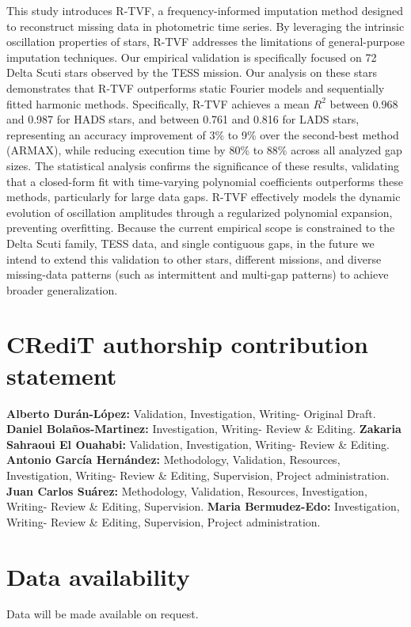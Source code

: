 \documentclass[a4paper,fleqn]{cas-sc}
\begin{document}
This study introduces R-TVF, a frequency-informed imputation method designed to reconstruct missing data in photometric time series. By leveraging the intrinsic oscillation properties of stars, R-TVF addresses the limitations of general-purpose imputation techniques. Our empirical validation is specifically focused on 72 Delta Scuti stars observed by the TESS mission. Our analysis on these stars demonstrates that R-TVF outperforms static Fourier models and sequentially fitted harmonic methods.  Specifically, R-TVF achieves a mean $R^2$ between 0.968 and 0.987 for HADS stars, and between 0.761 and 0.816 for LADS stars, representing an accuracy improvement of 3\% to 9\% over the second-best method (ARMAX), while reducing execution time by 80\% to 88\% across all analyzed gap sizes. The statistical analysis confirms the significance of these results, validating that a closed-form fit with time-varying polynomial coefficients outperforms these methods, particularly for large data gaps. R-TVF effectively models the dynamic evolution of oscillation amplitudes through a regularized polynomial expansion, preventing overfitting. Because the current empirical scope is constrained to the Delta Scuti family, TESS data, {\color{blue}and single contiguous gaps}, in the future we intend to extend this validation to other stars, different missions, {\color{blue}and diverse missing-data patterns (such as intermittent and multi-gap patterns)} to achieve broader generalization.


\section*{CRediT authorship contribution statement}
\textbf{Alberto Durán-López:} Validation, Investigation, Writing- Original Draft. \textbf{Daniel Bolaños-Martinez:} Investigation, Writing- Review \& Editing. \textbf{Zakaria Sahraoui El Ouahabi:} Validation, Investigation, Writing- Review \& Editing. \textbf{Antonio García Hernández:} Methodology, Validation, Resources, Investigation, Writing- Review \& Editing, Supervision, Project administration. \textbf{Juan Carlos Suárez:} Methodology, Validation, Resources, Investigation, Writing- Review \& Editing, Supervision. \textbf{Maria Bermudez-Edo:} Investigation, Writing- Review \& Editing, Supervision, Project administration.

\section*{Data availability}
Data will be made available on request.
\end{document}
